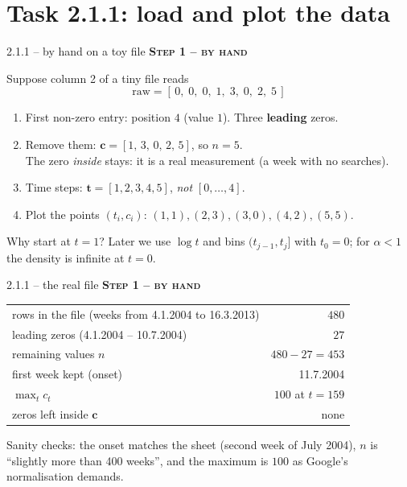 \documentclass[aspectratio=169,11pt]{beamer}
\newcommand{\stage}[2]{{\color{#1}\bfseries\small\textsc{#2}}\par\smallskip}
\newcommand{\Byhand}{\stage{hand}{Step 1 -- by hand}}
\begin{document}
\section{Task 2.1.1: load and plot the data}

\begin{frame}{2.1.1 -- by hand on a toy file}\small
\Byhand
Suppose column 2 of a tiny file reads
\[
\text{raw}=[\,0,\;0,\;0,\;1,\;3,\;0,\;2,\;5\,]
\]
\begin{enumerate}
\item First non-zero entry: position $4$ (value $1$). Three \textbf{leading} zeros.
\item Remove them: $\bm c=[1,\,3,\,0,\,2,\,5]$, so $n=5$.\\
\quad The zero \emph{inside} stays: it is a real measurement (a week with no searches).
\item Time steps: $\bm t=[1,2,3,4,5]$, \emph{not} $[0,\dots,4]$.
\item Plot the points $(t_i,c_i)$: $(1,1),(2,3),(3,0),(4,2),(5,5)$.
\end{enumerate}
\medskip
\alert{Why start at $t=1$?} Later we use $\log t$ and bins $(t_{j-1},t_j]$ with $t_0=0$; for $\alpha<1$ the density is infinite at $t=0$.
\end{frame}

\begin{frame}{2.1.1 -- the real file}
\Byhand
\begin{center}
\begin{tabular}{lr}
\toprule
rows in the file (weeks from 4.1.2004 to 16.3.2013) & $480$\\
leading zeros (4.1.2004 -- 10.7.2004) & $27$\\
remaining values $n$ & $480-27=453$\\
first week kept (onset) & 11.7.2004\\
$\max_t c_t$ & $100$ at $t=159$\\
zeros left inside $\bm c$ & none\\
\bottomrule
\end{tabular}
\end{center}
\medskip
Sanity checks: the onset matches the sheet (second week of July 2004), $n$ is ``slightly more than 400 weeks'', and the maximum is $100$ as Google's normalisation demands.
\end{frame}
\end{document}
